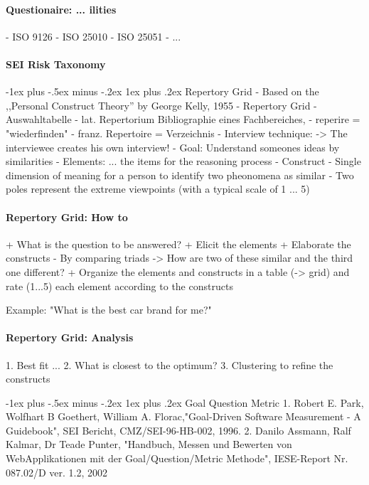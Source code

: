\documentclass[a4paper]{article}
\makeatletter
\renewcommand{\subsubsection}{\@startsection{subsubsection}{3}{0mm}%
                                {-1ex plus -.5ex minus -.2ex}%
                                {1ex plus .2ex}%
                                {\normalfont\small\bfseries}}
\makeatother
\begin{document}
\begin{multicols}{3}
  \paragraph{Questionaire: ... ilities}
  - ISO 9126
  - ISO 25010
  - ISO 25051
  - ...
  
  \paragraph{SEI Risk Taxonomy}
  
  \subsubsection{Repertory Grid}
  - Based on the ,,Personal Construct Theory'' by George Kelly, 1955
  - Repertory Grid - Auswahltabelle
      - lat. Repertorium Bibliographie eines Fachbereiches,
      - reperire = "wiederfinden"
      - franz. Repertoire = Verzeichnis
  - Interview technique: -> The interviewee creates his own interview!
  - Goal: Understand someones ideas by similarities
  - Elements: ... the items for the reasoning process
  - Construct
      - Single dimension of meaning for a person to identify two pheonomena as similar
      - Two poles represent the extreme viewpoints (with a typical scale of 1 ... 5)
  
  \paragraph{Repertory Grid: How to}
  + What is the question to be answered?
  + Elicit the elements
  + Elaborate the constructs
      - By comparing triads -> How are two of these similar and the third one different?
  + Organize the elements and constructs in a table (-> grid) and rate (1...5) each element according to the constructs
  
  Example: "What is the best car brand for me?"
  
  \paragraph{Repertory Grid: Analysis}
  1. Best fit ...
  2. What is closest to the optimum?
  3. Clustering to refine the constructs
  
  
  \subsubsection{Goal Question Metric}
  1. Robert E. Park, Wolfhart B Goethert, William A. Florac,"Goal-Driven Software Measurement - A Guidebook", SEI Bericht, CMZ/SEI-96-HB-002, 1996.
  2. Danilo Assmann, Ralf Kalmar, Dr Teade Punter, "Handbuch, Messen und Bewerten von WebApplikationen mit der Goal/Question/Metric Methode", IESE-Report Nr. 087.02/D ver. 1.2, 2002
  

\end{multicols}
\end{document}
